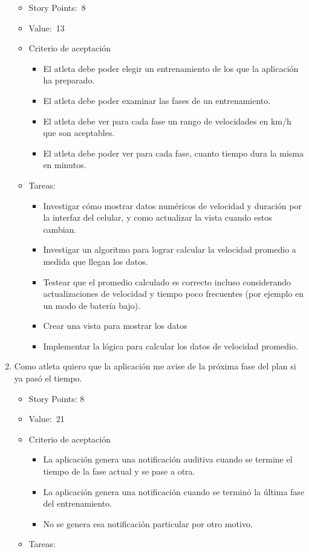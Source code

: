 \begin{enumerate}
  \begin{itemize}
  \item
    Story Points:~8
  \item
    Value:~13
  \item
    Criterio de aceptación

    \begin{itemize}
    \item
      El atleta debe poder elegir un entrenamiento de los que la
      aplicación ha preparado.
    \item
      El atleta debe poder examinar las fases de un entrenamiento.
    \item
      El atleta debe ver para cada fase un rango de velocidades en km/h
      que son aceptables.
    \item
      El atleta debe poder ver para cada fase, cuanto tiempo dura la
      misma en minutos.
    \end{itemize}
  \item
    Tareas:

    \begin{itemize}
    \item
      Investigar cómo mostrar datos numéricos de velocidad y duración
      por la interfaz del celular, y como actualizar la vista cuando
      estos cambian.
    \item
      Investigar un algoritmo para lograr calcular la velocidad promedio
      a medida que llegan los datos.
    \item
      Testear que el promedio calculado es correcto incluso considerando
      actualizaciones de velocidad y tiempo poco frecuentes (por ejemplo
      en un modo de batería bajo).
    \item
      Crear una vista para mostrar los datos
    \item
      Implementar la lógica para calcular los datos de velocidad
      promedio.
    \end{itemize}
  \end{itemize}
\item
  Como atleta quiero que la aplicación me avise de la próxima fase del
  plan si ya pasó el tiempo.

  \begin{itemize}
  \item
    Story Points: 8
  \item
    Value:~21
  \item
    Criterio de aceptación

    \begin{itemize}
    \item
      La aplicación genera una notificación auditiva cuando se termine
      el tiempo de la fase actual y se pase a otra.
    \item
      La aplicación genera una notificación cuando se terminó la última
      fase del entrenamiento.
    \item
      No se genera esa notificación particular por otro motivo.
    \end{itemize}
  \item
    Tareas:


\end{itemize}
\end{enumerate}
